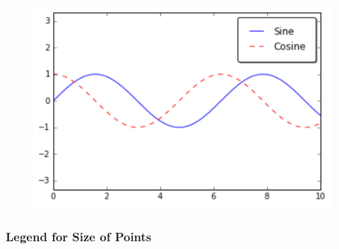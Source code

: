 \documentclass[]{book}
\begin{document}
\begin{figure}
\centering
\includegraphics{images/legend3.png}
\caption{}
\end{figure}

\subsubsection{Legend for Size of
Points}\label{legend-for-size-of-points}
\end{document}
